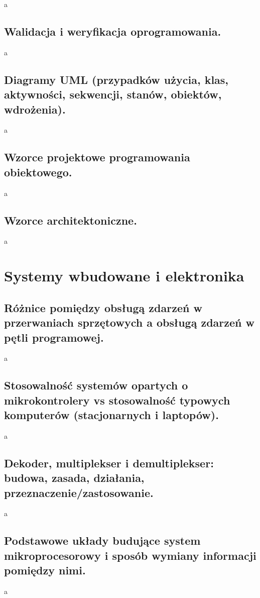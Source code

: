 \documentclass[a4paper,12pt,oneside]{book}
\begin{document}
				a
			\newpage\subsection{\color{red}Walidacja i weryfikacja oprogramowania.}
				a
			\newpage\subsection{\color{red}Diagramy UML (przypadków użycia, klas, aktywności, sekwencji, stanów, obiektów, wdrożenia).}
				a
			\newpage\subsection{\color{red}Wzorce projektowe programowania obiektowego.}
				a
			\newpage\subsection{\color{red}Wzorce architektoniczne.}
				a
		
		\newpage\section{Systemy wbudowane i elektronika}
			\subsection{\color{red}Różnice pomiędzy obsługą zdarzeń w przerwaniach sprzętowych a obsługą zdarzeń w pętli programowej.}
				a
			\newpage\subsection{\color{red}Stosowalność systemów opartych o mikrokontrolery vs stosowalność typowych komputerów (stacjonarnych i laptopów).}
				a
			\newpage\subsection{\color{red}Dekoder, multiplekser i demultiplekser: budowa, zasada, działania, przeznaczenie/zastosowanie.}
				a
			\newpage\subsection{\color{red}Podstawowe układy budujące system mikroprocesorowy i sposób wymiany informacji pomiędzy nimi.}
				a
\end{document}
